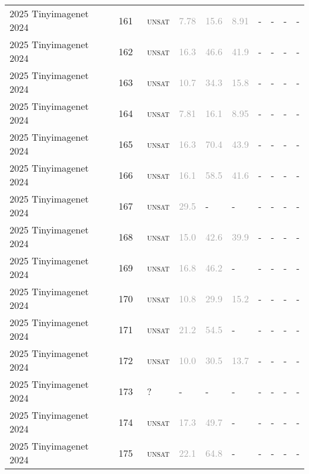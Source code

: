 \begin{center}
{\begin{longtable}{@{}llllllllll@{}}
2025 Tinyimagenet 2024 & 161 & ~\textsc{unsat} & \textcolor{darkgray}{7.78} & \textcolor{darkgray}{15.6} & \textcolor{darkgray}{8.91} & - & - & - & - \\
2025 Tinyimagenet 2024 & 162 & ~\textsc{unsat} & \textcolor{darkgray}{16.3} & \textcolor{darkgray}{46.6} & \textcolor{darkgray}{41.9} & - & - & - & - \\
2025 Tinyimagenet 2024 & 163 & ~\textsc{unsat} & \textcolor{darkgray}{10.7} & \textcolor{darkgray}{34.3} & \textcolor{darkgray}{15.8} & - & - & - & - \\
2025 Tinyimagenet 2024 & 164 & ~\textsc{unsat} & \textcolor{darkgray}{7.81} & \textcolor{darkgray}{16.1} & \textcolor{darkgray}{8.95} & - & - & - & - \\
2025 Tinyimagenet 2024 & 165 & ~\textsc{unsat} & \textcolor{darkgray}{16.3} & \textcolor{darkgray}{70.4} & \textcolor{darkgray}{43.9} & - & - & - & - \\
2025 Tinyimagenet 2024 & 166 & ~\textsc{unsat} & \textcolor{darkgray}{16.1} & \textcolor{darkgray}{58.5} & \textcolor{darkgray}{41.6} & - & - & - & - \\
2025 Tinyimagenet 2024 & 167 & ~\textsc{unsat} & \textcolor{darkgray}{29.5} & - & - & - & - & - & - \\
2025 Tinyimagenet 2024 & 168 & ~\textsc{unsat} & \textcolor{darkgray}{15.0} & \textcolor{darkgray}{42.6} & \textcolor{darkgray}{39.9} & - & - & - & - \\
2025 Tinyimagenet 2024 & 169 & ~\textsc{unsat} & \textcolor{darkgray}{16.8} & \textcolor{darkgray}{46.2} & - & - & - & - & - \\
2025 Tinyimagenet 2024 & 170 & ~\textsc{unsat} & \textcolor{darkgray}{10.8} & \textcolor{darkgray}{29.9} & \textcolor{darkgray}{15.2} & - & - & - & - \\
2025 Tinyimagenet 2024 & 171 & ~\textsc{unsat} & \textcolor{darkgray}{21.2} & \textcolor{darkgray}{54.5} & - & - & - & - & - \\
2025 Tinyimagenet 2024 & 172 & ~\textsc{unsat} & \textcolor{darkgray}{10.0} & \textcolor{darkgray}{30.5} & \textcolor{darkgray}{13.7} & - & - & - & - \\
2025 Tinyimagenet 2024 & 173 & ~? & - & - & - & - & - & - & - \\
2025 Tinyimagenet 2024 & 174 & ~\textsc{unsat} & \textcolor{darkgray}{17.3} & \textcolor{darkgray}{49.7} & - & - & - & - & - \\
2025 Tinyimagenet 2024 & 175 & ~\textsc{unsat} & \textcolor{darkgray}{22.1} & \textcolor{darkgray}{64.8} & - & - & - & - & - \\

\end{longtable}}
\end{center}
